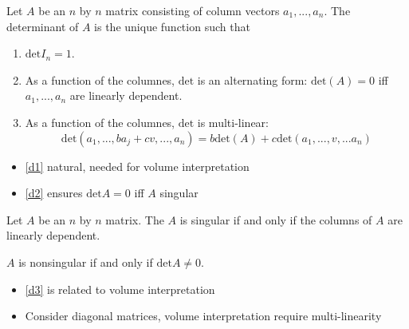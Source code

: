 \documentclass[compress]{beamer}
\renewcommand{\det}{\mathrm{det}}
\theoremstyle{definition}
\begin{document}
\begin{frame}
  \begin{definition}\label{deta}
    Let $A$ be an $n$ by $n$ matrix consisting of column vectors $a_1,
    ..., a_n$. The determinant of $A$ is the unique function such that
    \begin{enumerate}
    \item\label{d1} $\det I_n = 1$.
    \item\label{d2} As a function of the columnes, $\det$ is an
      alternating form: 
      $\det (A) = 0$ iff $a_1, ..., a_n$ are linearly dependent.
    \item\label{d3} As a function of the columnes, $\det$ is multi-linear:
      \[
      \det(a_1, ..., b a_j + c v, ..., a_n) = b\det(A) +
      c\det(a_1,...,v,...a_n) 
      \]
    \end{enumerate}
  \end{definition}
\end{frame}

\begin{frame}
  \begin{itemize}
  \item \ref{d1} natural, needed for volume interpretation
  \item \ref{d2} ensures $\det A = 0$ iff $A$ singular
  \end{itemize}
  \begin{lemma}
    Let $A$ be an $n$ by $n$ matrix. The $A$ is singular if and only if
    the columns of $A$ are linearly dependent.
  \end{lemma}
  \begin{corollary}\label{cor:dns}
    $A$ is nonsingular if and only if $\det A \neq 0$.
  \end{corollary}
\end{frame}

\begin{frame}
  \begin{itemize}
  \item \ref{d3} is related to volume interpretation
  \item Consider diagonal matrices, volume interpretation require
    multi-linearity
  \end{itemize}
\end{frame}
\end{document}
